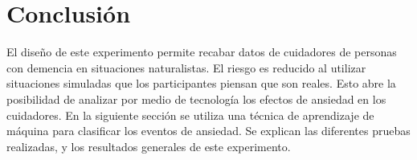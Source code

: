\section{Conclusi\'on}
El dise\~no de este experimento permite recabar datos de cuidadores de personas con demencia en situaciones naturalistas. El riesgo es reducido al utilizar situaciones simuladas que los participantes piensan que son reales. Esto abre la posibilidad de analizar por medio de tecnolog\'ia los efectos de ansiedad en los cuidadores.
En la siguiente secci\'on se utiliza una t\'ecnica de aprendizaje de m\'aquina para clasificar los eventos de ansiedad. Se explican las diferentes pruebas realizadas, y los resultados generales de este experimento.
\newpage

